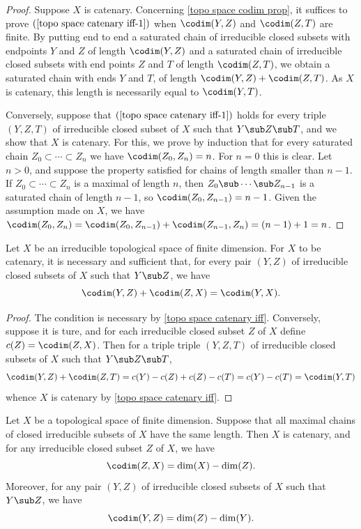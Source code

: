 \begin{proof}
Suppose $X$ is catenary. Concerning \cref{topo space codim prop}, it suffices to prove $(\ref{topo space catenary iff-1})$ when $\codim(Y,Z)$ and $\codim(Z,T)$ are finite. By putting end to end a saturated chain of irreducible closed subsets with endpoints $Y$ and $Z$ of length $\codim(Y,Z)$ and a saturated chain of irreducible closed subsets with end points $Z$ and $T$ of length $\codim(Z,T)$, we obtain a saturated chain with ends $Y$ and $T$, of length $\codim(Y,Z)+\codim(Z,T)$. As $X$ is catenary, this length is necessarily equal to $\codim(Y,T)$.\par
Conversely, suppose that $(\ref{topo space catenary iff-1})$ holds for every triple $(Y,Z,T)$ of irreducible closed subset of $X$ such that $Y\sub Z\sub T$, and we show that $X$ is catenary. For this, we prove by induction that for every saturated chain $Z_0\subset\cdots\subset Z_n$ we have $\codim(Z_0,Z_n)=n$. For $n=0$ this is clear. Let $n>0$, and suppose the property satisfied for chains of length smaller than $n-1$. If $Z_0\subset\cdots\subset Z_n$ is a maximal of length $n$, then $Z_0\sub\cdots \sub Z_{n-1}$ is a saturated chain of length $n-1$, so $\codim(Z_0,Z_{n-1})=n-1$. Given the assumption made on $X$, we have $\codim(Z_0,Z_n)=\codim(Z_0,Z_{n-1})+\codim(Z_{n-1},Z_n)=(n-1)+1=n$.
\end{proof}
\begin{corollary}\label{topo space irreducible finite dim catenary iff}
Let $X$ be an irreducible topological space of finite dimension. For $X$ to be catenary, it is necessary and sufficient that, for every pair $(Y,Z)$ of irreducible closed subsets of $X$ such that $Y\sub Z$, we have
\[\codim(Y,Z)+\codim(Z,X)=\codim(Y,X).\]
\end{corollary}
\begin{proof}
The condition is necessary by \cref{topo space catenary iff}. Conversely, suppose it is ture, and for each irreducible closed subset $Z$ of $X$ define $c(Z)=\codim(Z,X)$. Then for a triple triple $(Y,Z,T)$ of irreducible closed subsets of $X$ such that $Y\sub Z\sub T$,
\[\codim(Y,Z)+\codim(Z,T)=c(Y)-c(Z)+c(Z)-c(T)=c(Y)-c(T)=\codim(Y,T)\]
whence $X$ is catenary by \cref{topo space catenary iff}.
\end{proof}
\begin{proposition}\label{topo space maximal chain same length is catenary}
Let $X$ be a topological space of finite dimension. Suppose that all maximal chains of closed irreducible subsets of $X$ have the same length. Then $X$ is catenary, and for any irreducible closed subset $Z$ of $X$, we have
\[\codim(Z,X)=\dim(X)-\dim(Z).\]
Moreover, for any pair $(Y,Z)$ of irreducible closed subsets of $X$ such that $Y\sub Z$, we have
\[\codim(Y,Z)=\dim(Z)-\dim(Y).\]
\end{proposition}

